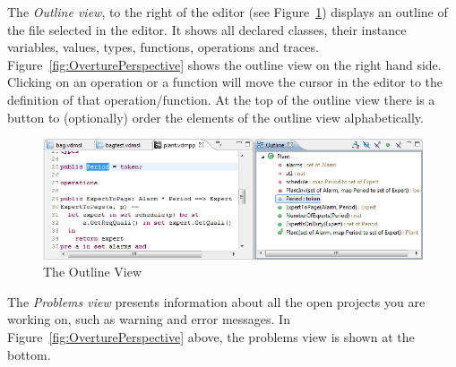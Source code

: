 

The \emph{Outline view}, to the right of the editor (see Figure~\ref{fig:OutlineView}) displays an outline of the file selected in the editor. It shows all declared classes, their instance variables, values, types, functions, operations and traces. Figure~\ref{fig:OverturePerspective} shows the outline view on the right hand side. Clicking on an operation or a function will move the cursor in the editor to the definition of that operation/function. At the top of the outline view there is a button to (optionally) order
the elements of the outline view alphabetically.
%
\begin{figure}[!htb]
\begin{center}
  \includegraphics[width=4.5in]{figures/OutlineView}
  \caption[labelInTOC]{The Outline View}
  \label{fig:OutlineView}
\end{center}
\end{figure}
%
The \emph{Problems view} presents information about all the open projects you are working on, such as warning and error messages. In Figure~\ref{fig:OverturePerspective} above, the problems view is shown at the bottom.

